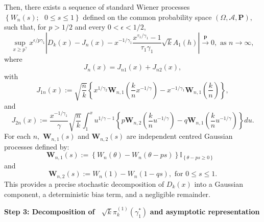 \documentclass[reqno,openbib,runningheads,a4paper,12pt]{amsart}%
\begin{document}
\noindent Then, there exists a sequence of standard Wiener processes $\left\{
W_{n}\left(  s\right)  ;\text{ }0\leq s\leq1\right\}  $ defined on the common
probability space $\left(  \Omega,\mathcal{A},\mathbf{P}\right)  ,$ such that,
for $p>1/2$ and every $0<\epsilon<1/2,$%
\begin{equation}
\sup_{x\geq p^{\gamma}}x^{\epsilon/p\gamma_{1}}\left\vert D_{k}\left(
x\right)  -J_{n}\left(  x\right)  -x^{-1/\gamma_{1}}\dfrac{x^{\tau_{1}%
/\gamma_{1}}-1}{\tau_{1}\gamma_{1}}\sqrt{k}A_{1}\left(  h\right)  \right\vert
\overset{\mathbf{p}}{\rightarrow}0,\text{ as }n\rightarrow\infty
,\label{appoxi}%
\end{equation}
where
\begin{equation}
J_{n}\left(  x\right)  =J_{n1}\left(  x\right)  +J_{n2}\left(  x\right)
,\label{Jn}%
\end{equation}
with%
\[
J_{1n}\left(  x\right)  :=\sqrt{\frac{n}{k}}\left\{  x^{1/\gamma_{2}%
}\mathbf{W}_{n,1}\left(  \frac{k}{n}x^{-1/\gamma}\right)  -x^{-1/\gamma_{1}%
}\mathbf{W}_{n,1}\left(  \frac{k}{n}\right)  \right\}  ,
\]
and
\[
J_{2n}\left(  x\right)  :=\dfrac{x^{-1/\gamma_{1}}}{\gamma}\sqrt{\dfrac{n}{k}}%
{\displaystyle\int_{1}^{x}}
u^{1/\gamma-1}\left\{  p\mathbf{W}_{n,2}\left(  \dfrac{k}{n}u^{-1/\gamma
}\right)  -q\mathbf{W}_{n,1}\left(  \dfrac{k}{n}u^{-1/\gamma}\right)
\right\}  du.
\]
For each $n,$ $\mathbf{W}_{n,1}\left(  s\right)  $ and $\mathbf{W}%
_{n,2}\left(  s\right)  $ are independent centred Gaussian processes defined
by:%
\[
\mathbf{W}_{n,1}\left(  s\right)  :=\left\{  W_{n}\left(  \theta\right)
-W_{n}\left(  \theta-ps\right)  \right\}  \mathbb{I}_{\left\{  \theta
-ps\geq0\right\}  }\text{ }%
\]
and
\[
\mathbf{W}_{n,2}\left(  s\right)  :=W_{n}\left(  1\right)  -W_{n}\left(
1-qs\right)  ,\text{ for }0\leq s\leq1.
\]
This provides a precise stochastic decomposition of $D_{k}\left(  x\right)  $
into a Gaussian component, a deterministic bias term, and a negligible
remainder.\textbf{\medskip}

\noindent\textbf{Step 3: Decomposition of \ }$\sqrt{k}\pi_{k}^{\left(
1\right)  }\left(  \gamma_{1}^{\ast}\right)  $ \textbf{and asymptotic
representation\medskip}
\end{document}
